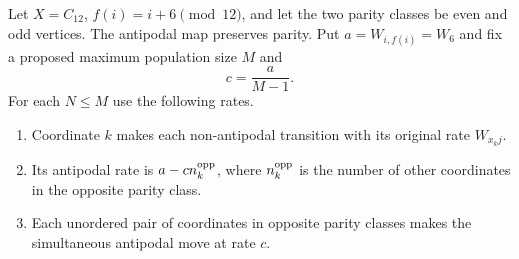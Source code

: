 \documentclass[11pt,a4paper]{article}
\begin{document}
Let $X=C_{12}$, $f(i)=i+6\pmod{12}$, and let the two parity classes be
even and odd vertices. The antipodal map preserves parity. Put
$a=W_{i,f(i)}=W_6$ and fix a proposed maximum population size $M$ and
\[
 c=\frac{a}{M-1}.
\]
For each $N\le M$ use the following rates.

\begin{enumerate}
\item Coordinate $k$ makes each non-antipodal transition with its original
rate $W_{x_kj}$.
\item Its antipodal rate is $a-c n_k^{\rm opp}$, where
$n_k^{\rm opp}$ is the number of other coordinates in the opposite parity
class.
\item Each unordered pair of coordinates in opposite parity classes
makes the simultaneous antipodal move at rate $c$.
\end{enumerate}
\end{document}
